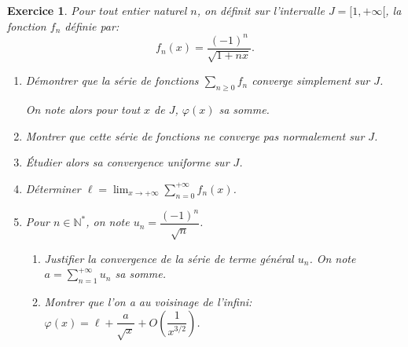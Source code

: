 \documentclass[12pt,a4paper]{article}
\newcommand{\N}{\mathbb{N}}
\theoremstyle{break}
\theoremstyle{break}
\newtheorem{Exo}{Exercice}
\begin{document}
\begin{Exo}
	Pour tout entier naturel $n$, on d\'efinit sur l'intervalle $J = [1,+\infty[$, la fonction $f_n$ d\'efinie par:
	\[
	f_n(x) = \frac{(-1)^n}{\sqrt{1+nx}}.
	\]
	\begin{enumerate}
		\item D\'emontrer que la s\'erie de fonctions $\displaystyle\sum_{n\geqslant 0} f_n$ converge simplement sur $J$.
		
		On note alors pour tout $x$ de $J$, $\varphi(x)$ sa somme.
		\item Montrer que cette s\'erie de fonctions ne converge pas normalement sur $J$.
		\item \'Etudier alors sa convergence uniforme sur $J$.
		\item D\'eterminer $\ell = \displaystyle\lim_{x\to +\infty} \sum_{n=0}^{+\infty} f_n(x)$.
		\item Pour $n \in \N^*$, on note $u_n = \dfrac{(-1)^n}{\sqrt{n}}$.
		\begin{enumerate}
			\item[5.1.] Justifier la convergence de la s\'erie de terme g\'en\'eral $u_n$. On note $a = \displaystyle\sum_{n=1}^{+\infty} u_n$ sa somme.
			\item[5.2.] Montrer que l'on a au voisinage de l'infini: $\varphi(x) = \ell + \dfrac{a}{\sqrt{x}}+O\left(\dfrac{1}{x^{3/2}}\right)$.
		\end{enumerate}
	\end{enumerate}
	
\end{Exo}
\end{document}
